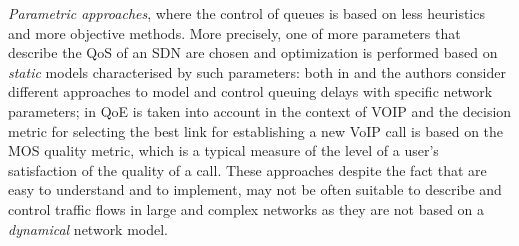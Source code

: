 \textit{Parametric approaches}, where the control of queues is based on less heuristics and more objective methods. More precisely, one of more parameters that describe the QoS of an SDN are chosen and optimization is performed based on \textit{static} models characterised by such parameters: both in \cite{Haiyan} and \cite{ChenWang} the authors consider different approaches to model and control queuing delays with specific network parameters; in \cite{Najjar} QoE is taken into account in the context of VOIP and the decision metric for selecting the best link for establishing a new VoIP call is based on the MOS quality metric, which is a typical measure of the level of a user's satisfaction of the quality of a call. These approaches despite the fact that are easy to understand and to implement, may not be often suitable to describe and control traffic flows in large and complex networks as they are not based on a \textit{dynamical} network model.
  
